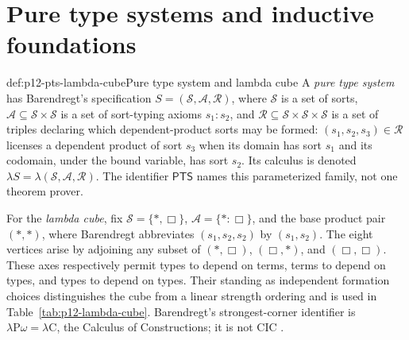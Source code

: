 \section{Pure type systems and inductive foundations}

\begin{hbdefinition}{def:p12-pts-lambda-cube}{Pure type system and lambda cube}
A \emph{pure type system} has Barendregt's specification
\(S=(\mathcal S,\mathcal A,\mathcal R)\), where \(\mathcal S\) is a set of
sorts, \(\mathcal A\subseteq\mathcal S\mathbin{\times}\mathcal S\) is a set
of sort-typing axioms \(s_1{:}s_2\), and
\(\mathcal R\subseteq\mathcal S\mathbin{\times}\mathcal S
\mathbin{\times}\mathcal S\) is a set of triples declaring which
dependent-product sorts may be formed: \((s_1,s_2,s_3)\in\mathcal R\)
licenses a dependent product of sort \(s_3\) when its domain has sort \(s_1\)
and its codomain, under the bound variable, has sort \(s_2\).  Its calculus is
denoted
\(\lambda S=\lambda(\mathcal S,\mathcal A,\mathcal R)\).  The identifier
\(\mathsf{PTS}\) names this parameterized family, not one theorem prover.

For the \emph{lambda cube}, fix
\(\mathcal S=\{\ast,\Box\}\),
\(\mathcal A=\{\ast{:}\Box\}\), and the base product pair
\((\ast,\ast)\), where Barendregt abbreviates
\((s_1,s_2,s_2)\) by \((s_1,s_2)\).  The eight vertices arise by adjoining
any subset of \((\ast,\Box)\), \((\Box,\ast)\), and
\((\Box,\Box)\).  These axes respectively permit types to depend on terms,
terms to depend on types, and types to depend on types.  Their standing as
independent formation choices distinguishes the cube from a linear strength
ordering and is used in Table~\ref{tab:p12-lambda-cube}.  Barendregt's
strongest-corner identifier is \(\lambda\mathrm P\omega=\lambda\mathrm C\),
the Calculus of Constructions; it is not CIC
\cite{Barendregt1992,CoquandHuet1988}.
\end{hbdefinition}

